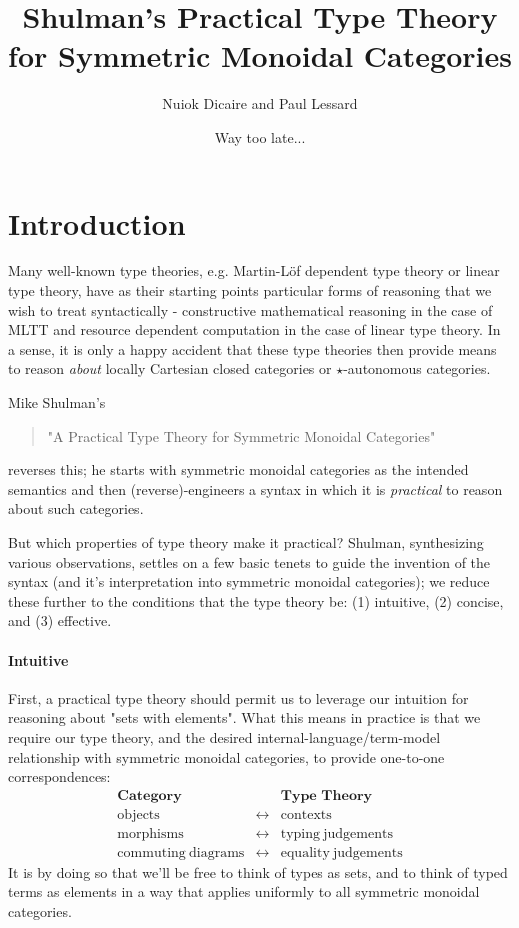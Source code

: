 \documentclass[pra,floatfix,
amsmath,superscriptaddress, 12pt]{article}
\title{Shulman's Practical Type Theory for Symmetric Monoidal Categories}
\author{Nuiok Dicaire and Paul Lessard}
\date{Way too late...}
\theoremstyle{definition}
\begin{document}
\maketitle



\section{Introduction}

Many well-known type theories, e.g. Martin-L\"{o}f dependent type theory or linear type theory, have as their starting points particular forms of reasoning that we wish to treat syntactically - constructive mathematical reasoning in the case of \textsf{MLTT} and resource dependent computation in the case of linear type theory. In a sense, it is only a happy accident that these type theories then provide means to reason \emph{about} locally Cartesian closed categories or $\star$-autonomous categories.

Mike Shulman's 
\begin{quotation}
    "A Practical Type Theory for Symmetric Monoidal Categories"
\end{quotation}
reverses this; he starts with symmetric monoidal categories as the intended semantics and then (reverse)-engineers a syntax in which it is \emph{practical} to reason about such categories.

But which properties of type theory make it practical? Shulman, synthesizing various observations, settles on a few basic tenets to guide the invention of the syntax (and it's interpretation into symmetric monoidal categories); we reduce these further to the conditions that the type theory be: (1) intuitive, (2) concise, and (3) effective.

\paragraph{Intuitive} First, a practical type theory should permit us to leverage our intuition for reasoning about "sets with elements". What this means in practice is that we require our type theory, and the desired internal-language/term-model relationship with symmetric monoidal categories, to provide one-to-one correspondences:
\begin{eqnarray*}
\textbf{Category}              &  & \textbf{Type Theory}\\
\mathrm{objects}                & \longleftrightarrow & \mathrm{contexts}\\
\mathrm{morphisms}              & \longleftrightarrow & \mathrm{typing\ judgements}\\
\mathrm{commuting\ diagrams}     & \longleftrightarrow & \mathrm{equality\ judgements}
\end{eqnarray*}
It is by doing so that we'll be free to think of types as sets, and to think of typed terms as elements in a way that applies uniformly to all symmetric monoidal categories.
\end{document}

